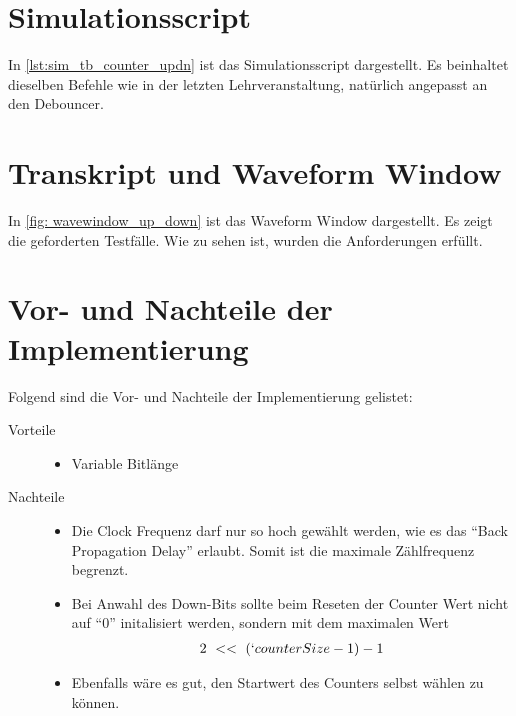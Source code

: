 \documentclass[./\jobname.tex]{subfiles}
\begin{document}
\section{Simulationsscript}
%
In \autoref{lst:sim_tb_counter_updn} ist das Simulationsscript dargestellt. Es beinhaltet dieselben Befehle wie in der letzten Lehrveranstaltung, natürlich angepasst an den Debouncer.
%

%
\section{Transkript und Waveform Window}
%
In \autoref{fig: wavewindow_up_down} ist das Waveform Window dargestellt. Es zeigt die geforderten Testfälle. Wie zu sehen ist, wurden die Anforderungen erfüllt.
%
\begin{figure}[H]
	\centering
	\noindent{}
	\label{fig: wavewindow_up_down}
\end{figure}
%
%
%
\section{Vor- und Nachteile der Implementierung}
%
Folgend sind die Vor- und Nachteile der Implementierung gelistet:
%
\begin{description}
	\item[Vorteile] \hfil
	\begin{itemize}
		\item Variable Bitlänge
	\end{itemize}
	\item[Nachteile] \hfil
	\begin{itemize}
		\item Die Clock Frequenz darf nur so hoch gewählt werden, wie es das \enquote{Back Propagation Delay} erlaubt. Somit ist die maximale Zählfrequenz begrenzt.
		\item Bei Anwahl des Down-Bits sollte beim Reseten der Counter Wert nicht auf \enquote{0} initalisiert werden, sondern mit dem maximalen Wert
		\begin{align}
		2~<<~ (`counterSize-1) - 1
		\end{align}
		\item Ebenfalls wäre es gut, den Startwert des Counters selbst wählen zu können.
	\end{itemize}
\end{description}
%
\end{document}
